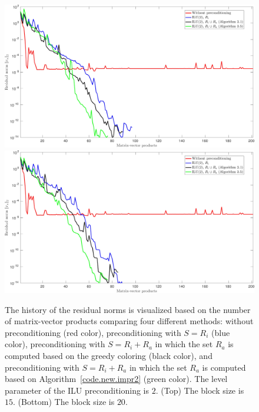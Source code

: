 \documentclass[12pt, twoside,a4paper,toc=bibliography]{scrbook}
\newcommand{\coderef}[1]{Algorithm~\protect\ref{#1}}
\begin{document}
\begin{figure}
\centering
\includegraphics[width=\linewidth]{jac_convergence_greedy_new_15.jpg}
\includegraphics[width=\linewidth]{jac_convergence_greedy_new_20.jpg}
\caption{
The history of the residual norms is visualized based on
the number of matrix-vector products comparing four different methods:
without preconditioning (red color),
preconditioning with $S=R_i$ (blue color),
preconditioning with $S=R_i + R_a$ in which
the set $R_a$ is computed based on the greedy coloring (black color),
and preconditioning with $S=R_i + R_a$ in which
the set $R_a$ is computed based on \coderef{code.new.impr2} (green color).
The level parameter of the ILU preconditioning is $2$.
(Top) The block size is $15$.
(Bottom) The block size is $20$.
}
\label{f.convergence_greedy_new3}
\end{figure}
\end{document}
